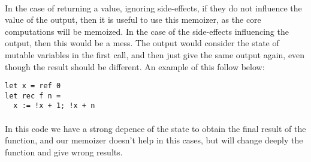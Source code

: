 \documentclass[letterpaper,10pt]{article}
\begin{document}
\paragraph{} In the case of returning a value, ignoring side-effects, if they do not influence the value of the output, then it is useful to use this memoizer, as the core computations will be memoized. In the case of the side-effects influencing the output, then this would be a mess. The output would consider the state of mutable variables in the first call, and then just give the same output again, even though the result should be different. An example of this follow below:
\begin{verbatim}
let x = ref 0
let rec f n = 
  x := !x + 1; !x + n
\end{verbatim}
\paragraph{} In this code we have a strong depence of the state to obtain the final result of the function, and our memoizer doesn't help in this cases, but will change deeply the function and give wrong results.
\end{document}
